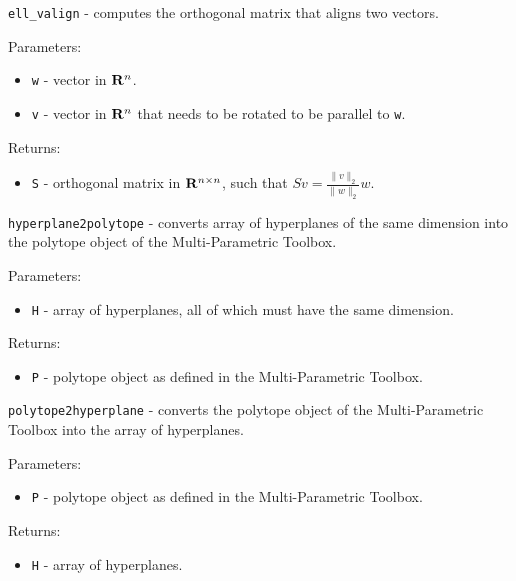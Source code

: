 \newpage

{\Large {\tt ell\_valign}} - computes the orthogonal matrix that aligns two
vectors.

Parameters:
\begin{itemize}
\item {\tt w} - vector in ${\bf R}^n$.
\item {\tt v} - vector in ${\bf R}^n$ that needs to be rotated to be parallel
to {\tt w}.
\end{itemize}

Returns:
\begin{itemize}
\item {\tt S} - orthogonal matrix in ${\bf R}^{n\times n}$, such that
$Sv = \frac{\|v\|_2}{\|w\|_2}w$.
\end{itemize}

\newpage

{\Large {\tt hyperplane2polytope}} - converts array of hyperplanes of the
same dimension into the polytope object of the Multi-Parametric Toolbox.

Parameters:
\begin{itemize}
\item {\tt H} - array of hyperplanes, all of which must have the same dimension.
\end{itemize}

Returns:
\begin{itemize}
\item {\tt P} - polytope object as defined in the Multi-Parametric Toolbox.
\end{itemize}

\newpage

{\Large {\tt polytope2hyperplane}} - converts the polytope object of the
Multi-Parametric Toolbox into the array of hyperplanes.

Parameters:
\begin{itemize}
\item {\tt P} - polytope object as defined in the Multi-Parametric Toolbox.
\end{itemize}

Returns:
\begin{itemize}
\item {\tt H} - array of hyperplanes.
\end{itemize}



